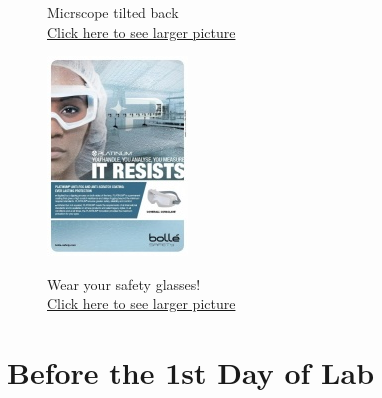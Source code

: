 \documentclass{../lab}
\begin{document}
\begin{figure}[!h]
  \caption{Micrscope tilted back \\
  \href{http://experimentationlab.berkeley.edu/sites/default/files/upimages/1_Tilt-Microscope_2542.JPG}{Click here to see larger picture}}
  \label{fig:TiltMicroscope}
\endminipage\hfill
{}
  \href{http://experimentationlab.berkeley.edu/sites/default/files/upimages/6_eye-wear-face.jpg}{\includegraphics[width=\linewidth,keepaspectratio]{images/6_eye-wear-face_small.jpg}}
  \caption{Wear your safety glasses! \\ \href{http://experimentationlab.berkeley.edu/sites/default/files/upimages/6_eye-wear-face.jpg}{Click here to see larger picture}}\label{fig:EyeWear}
\endminipage
\end{figure}

\section{Before the 1st Day of Lab}
\end{document}
